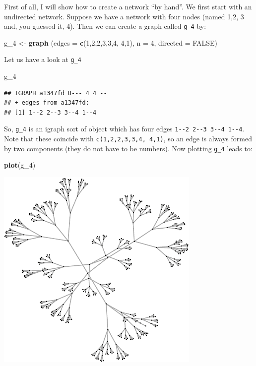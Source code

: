 \documentclass[]{article}
\newenvironment{Shaded}{\begin{snugshade}}{\end{snugshade}}
\newcommand{\KeywordTok}[1]{\textcolor[rgb]{0.13,0.29,0.53}{\textbf{{#1}}}}
\newcommand{\DataTypeTok}[1]{\textcolor[rgb]{0.13,0.29,0.53}{{#1}}}
\newcommand{\DecValTok}[1]{\textcolor[rgb]{0.00,0.00,0.81}{{#1}}}
\newcommand{\StringTok}[1]{\textcolor[rgb]{0.31,0.60,0.02}{{#1}}}
\newcommand{\OtherTok}[1]{\textcolor[rgb]{0.56,0.35,0.01}{{#1}}}
\newcommand{\NormalTok}[1]{{#1}}
\theoremstyle{definition}
\theoremstyle{definition}
\theoremstyle{definition}
\theoremstyle{remark}
\begin{document}
First of all, I will show how to create a network ``by hand''. We first
start with an undirected network. Suppose we have a network with four
nodes (named 1,2, 3 and, you guessed it, 4). Then we can create a graph
called \texttt{g\_4} by:

\begin{Shaded}
\begin{Highlighting}[]
\NormalTok{g_4 <-}\StringTok{ }\KeywordTok{graph} \NormalTok{(}\DataTypeTok{edges =} \KeywordTok{c}\NormalTok{(}\DecValTok{1}\NormalTok{,}\DecValTok{2}\NormalTok{,}\DecValTok{2}\NormalTok{,}\DecValTok{3}\NormalTok{,}\DecValTok{3}\NormalTok{,}\DecValTok{4}\NormalTok{, }\DecValTok{4}\NormalTok{,}\DecValTok{1}\NormalTok{), }\DataTypeTok{n =} \DecValTok{4}\NormalTok{, }\DataTypeTok{directed =} \OtherTok{FALSE}\NormalTok{)}
\end{Highlighting}
\end{Shaded}

Let us have a look at \texttt{g\_4}

\begin{Shaded}
\begin{Highlighting}[]
\NormalTok{g_4}
\end{Highlighting}
\end{Shaded}

\begin{verbatim}
## IGRAPH a1347fd U--- 4 4 -- 
## + edges from a1347fd:
## [1] 1--2 2--3 3--4 1--4
\end{verbatim}

So, \texttt{g\_4} is an igraph sort of object which has four edges
\texttt{1-\/-2\ 2-\/-3\ 3-\/-4\ 1-\/-4}. Note that these coincide with
\texttt{c(1,2,2,3,3,4,\ 4,1)}, so an edge is always formed by two
components (they do not have to be numbers). Now plotting \texttt{g\_4}
leads to:

\begin{Shaded}
\begin{Highlighting}[]
\KeywordTok{plot}\NormalTok{(g_4)}
\end{Highlighting}
\end{Shaded}

\includegraphics{ResearchTools_files/figure-latex/unnamed-chunk-45-1.pdf}
\end{document}

